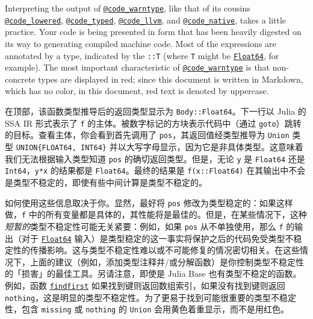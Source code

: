Interpreting the output of \hyperlink{8092893264277772840}{\texttt{@code\_warntype}}, like that of its cousins \hyperlink{1376948972689074219}{\texttt{@code\_lowered}}, \hyperlink{6823997547688846780}{\texttt{@code\_typed}}, \hyperlink{18039596607712979441}{\texttt{@code\_llvm}}, and \hyperlink{2629340111434042067}{\texttt{@code\_native}}, takes a little practice. Your code is being presented in form that has been heavily digested on its way to generating compiled machine code. Most of the expressions are annotated by a type, indicated by the \texttt{::T} (where \texttt{T} might be \hyperlink{5027751419500983000}{\texttt{Float64}}, for example). The most important characteristic of \hyperlink{8092893264277772840}{\texttt{@code\_warntype}} is that non-concrete types are displayed in red; since this document is written in Markdown, which has no color, in this document, red text is denoted by uppercase.



在顶部，该函数类型推导后的返回类型显示为 \texttt{Body::Float64}。下一行以 Julia 的 SSA IR 形式表示了 \texttt{f} 的主体。被数字标记的方块表示代码中（通过 \texttt{goto}）跳转的目标。查看主体，你会看到首先调用了 \texttt{pos}，其返回值经类型推导为 \texttt{Union} 类型 \texttt{UNION\{FLOAT64, INT64\}} 并以大写字母显示，因为它是非具体类型。这意味着我们无法根据输入类型知道 \texttt{pos} 的确切返回类型。但是，无论 \texttt{y} 是 \texttt{Float64} 还是 \texttt{Int64}，\texttt{y*x} 的结果都是 \texttt{Float64}。最终的结果是 \texttt{f(x::Float64)} 在其输出中不会是类型不稳定的，即使有些中间计算是类型不稳定的。



如何使用这些信息取决于你。显然，最好将 \texttt{pos} 修改为类型稳定的：如果这样做，\texttt{f} 中的所有变量都是具体的，其性能将是最佳的。但是，在某些情况下，这种\emph{短暂的}类型不稳定性可能无关紧要：例如，如果 \texttt{pos} 从不单独使用，那么 \texttt{f} 的输出（对于 \hyperlink{5027751419500983000}{\texttt{Float64}} 输入）是类型稳定的这一事实将保护之后的代码免受类型不稳定性的传播影响。这与类型不稳定性难以或不可能修复的情况密切相关。在这些情况下，上面的建议（例如，添加类型注释并/或分解函数）是你控制类型不稳定性的「损害」的最佳工具。另请注意，即使是 Julia Base 也有类型不稳定的函数。例如，函数 \hyperlink{13752961745140943082}{\texttt{findfirst}} 如果找到键则返回数组索引，如果没有找到键则返回 \texttt{nothing}，这是明显的类型不稳定性。为了更易于找到可能很重要的类型不稳定性，包含 \texttt{missing} 或 \texttt{nothing} 的 \texttt{Union} 会用黄色着重显示，而不是用红色。



